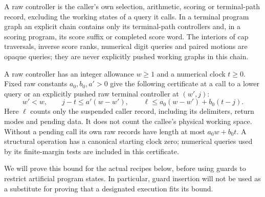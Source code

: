 \begin{definition}\label{def:ctrl-allowance}
A raw controller is the caller's own selection, arithmetic, scoring or
terminal-path record, excluding the working states of a query it calls.
In a terminal program graph an explicit chain contains only its
terminal-path controllers and, in a scoring program, its score suffix
or completed score word.  The interiors of cap traversals, inverse score
ranks, numerical digit queries and paired motions are opaque queries;
they are never explicitly pushed working graphs in this chain.

A raw controller has an integer allowance $w\ge1$ and a numerical clock
$t\ge0$.  Fixed raw constants $a_0,b_0,a'>0$ give the following
certificate at a call to a lower query or an explicitly pushed raw
terminal controller at $(w',j)$:
\begin{equation}\label{eq:ctrl-local-bound}
 w'<w,\qquad j-t\le a'(w-w'),\qquad
 \ell\le a_0(w-w')+b_0(t-j).
\end{equation}
Here $\ell$ counts only the suspended caller record, including its
delimiters, return modes and pending data.  It does not count the
callee's physical working space.  Without a pending call its own raw
records have length at most $a_0w+b_0t$.  A structural operation has a
canonical starting clock zero; numerical queries used by its
finite-margin tests are included in this certificate.
\end{definition}

We will prove this bound for the actual recipes below, before using
guards to restrict artificial program states.  In particular, guard
insertion will not be used as a substitute for proving that a designated
execution fits its bound.

